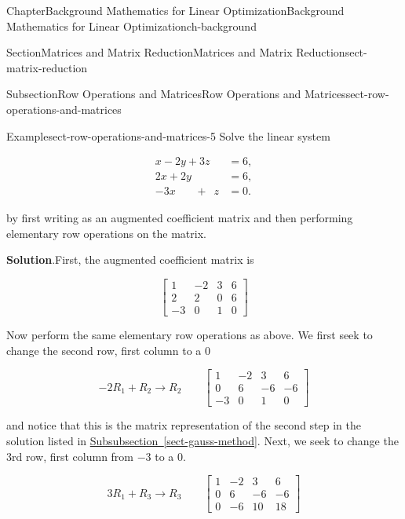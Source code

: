 \documentclass[oneside,10pt,]{book}
\newcommand{\blocktitlefont}{\relax}
\newcommand{\xreffont}{\relax}
\numberwithin{equation}{section}
\newcommand{\amp}{&}
\begin{document}
\begin{chapterptx}{Chapter}{Background Mathematics for Linear Optimization}{}{Background Mathematics for Linear Optimization}{}{}{ch-background}
\begin{sectionptx}{Section}{Matrices and Matrix Reduction}{}{Matrices and Matrix Reduction}{}{}{sect-matrix-reduction}
\begin{subsectionptx}{Subsection}{Row Operations and Matrices}{}{Row Operations and Matrices}{}{}{sect-row-operations-and-matrices}
\begin{example}{Example}{}{sect-row-operations-and-matrices-5}%
Solve the linear system%
\par
%
\begin{align*}
x -2y + 3z \amp = 6, \\
2x + 2y\phantom{+3z} \amp = 6, \\
-3x \phantom{+2y}+\phantom{3} z \amp = 0.
\end{align*}
%
\par
by first writing as an augmented coefficient matrix and then performing elementary row operations on the matrix.%
\par\smallskip%
\noindent\textbf{\blocktitlefont Solution}.\hypertarget{sect-row-operations-and-matrices-5-2}{}\quad{}First, the augmented coefficient matrix is%
\par
%
\begin{equation*}
\left[\begin{array}{rrr|r} 1 \amp -2 \amp 3 \amp 6 \\ 2 \amp 2 \amp 0 \amp 6 \\ -3 \amp 0 \amp 1 \amp 0 \end{array}\right]
\end{equation*}
%
\par
Now perform the same elementary row operations as above. We first seek to change the second row, first column to a 0%
\par
%
\begin{equation*}
-2 R_1 + R_2 \to R_2 \qquad \left[\begin{array}{rrr|r} 1 \amp -2 \amp 3 \amp 6 \\ 0 \amp 6 \amp -6 \amp -6 \\ -3 \amp 0 \amp 1 \amp 0 \end{array}\right]
\end{equation*}
%
\par
and notice that this is the matrix representation of the second step in the solution listed in \hyperref[sect-gauss-method]{Subsubsection~{\xreffont\ref{sect-gauss-method}}}. Next, we seek to change the 3rd row, first column from \(-3\) to a 0.%
\par
%
\begin{equation*}
3 R_1 + R_3 \to R_3 \qquad \left[\begin{array}{rrr|r} 1 \amp -2 \amp 3 \amp 6 \\ 0 \amp 6 \amp -6 \amp -6 \\ 0 \amp -6 \amp 10 \amp 18 \end{array}\right]

\end{equation*}
\end{example}
\end{subsectionptx}
\end{sectionptx}
\end{chapterptx}
\end{document}
